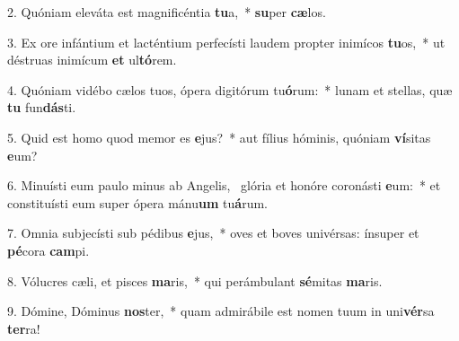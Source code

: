 2. Quóniam eleváta est magnificéntia \textbf{tu}a,~*  \textbf{su}per \textbf{cæ}los.\

3. Ex ore infántium et lacténtium perfecísti laudem propter inimícos \textbf{tu}os,~*  ut déstruas inimícum \textbf{et} ul\textbf{tó}rem.\

4. Quóniam vidébo cælos tuos, ópera digitórum tu\textbf{ó}rum:~*  lunam et stellas, quæ \textbf{tu} fun\textbf{dás}ti.\

5. Quid est homo quod memor es \textbf{e}jus?~*  aut fílius hóminis, quóniam \textbf{ví}sitas \textbf{e}um?\

6. Minuísti eum paulo minus ab Angelis, \dag\  glória et honóre coronásti \textbf{e}um:~*  et constituísti eum super ópera mánu\textbf{um} tu\textbf{á}rum.\

7. Omnia subjecísti sub pédibus \textbf{e}jus,~*  oves et boves univérsas: ínsuper et \textbf{pé}cora \textbf{cam}pi.\

8. Vólucres cæli, et pisces \textbf{ma}ris,~*  qui perámbulant \textbf{sé}mitas \textbf{ma}ris.\

9. Dómine, Dóminus \textbf{nos}ter,~*  quam admirábile est nomen tuum in uni\textbf{vér}sa \textbf{ter}ra!\

